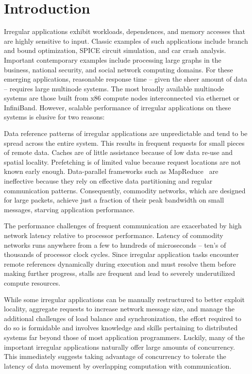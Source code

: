 \section{Introduction} \label{sec:intro}

Irregular applications exhibit workloads, dependences, and memory accesses
that are highly sensitive to input. Classic examples of such applications
include branch and bound optimization, SPICE circuit simulation, and car crash
analysis. Important contemporary examples include processing large graphs in
the business, national security, and social network computing domains. For
these emerging applications, reasonable response time -- given the sheer
amount of data -- requires large multinode systems. The most broadly available
multinode systems are those built from x86 compute nodes interconnected via
ethernet or InfiniBand. However, scalable performance of irregular
applications on these systems is elusive for two reasons:

\vspace{0.5ex}
 Data reference patterns of irregular applications are unpredictable and tend to be spread across the entire system. This results in frequent requests for small pieces of remote data. Caches are of little assistance because of low data re-use and spatial locality. Prefetching is of limited value because request locations are not known early enough. Data-parallel frameworks such as MapReduce~\cite{mapreduce:osdi04} are ineffective because they rely on effective data partitioning and regular communication patterns. Consequently, commodity networks, which are designed for large packets, achieve just a fraction of their peak bandwidth on small messages, starving application performance.

\vspace{0.5ex}  The performance challenges of frequent communication are exacerbated by high network latency relative to processor performance. Latency of commodity networks runs anywhere from a few to hundreds of microseconds -- ten's of thousands of processor clock cycles.  Since irregular application tasks encounter remote references dynamically during execution and must resolve them before making further progress, stalls are frequent and lead to severely underutilized compute resources.

While some irregular applications can be manually restructured to better exploit locality, aggregate requests to increase network message size, and manage the additional challenges of load balance and synchronization, the effort required to do so is formidable and involves knowledge and skills pertaining to distributed systems far beyond those of most application programmers. Luckily, many of the important irregular applications naturally offer large amounts of concurrency. This immediately suggests taking advantage of concurrency to tolerate the latency of data movement by overlapping computation with communication.

